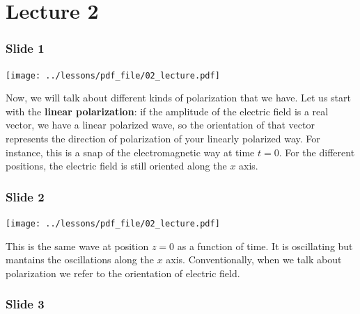 \documentclass[../main/main.tex]{subfiles}
\begin{document}
\pagestyle{plain}

\section{Lecture 2}


\subsubsection*{Slide 1}

\begin{minipage}[]{0.5\linewidth}
\centering
\texttt{[image: ../lessons/pdf\_file/02\_lecture.pdf]}
\end{minipage}
\hspace{0.3cm}\vspace{0.3cm}
\begin{minipage}[c]{0.47\linewidth}
Now, we will talk about different kinds of polarization that we have. Let us start with the \textbf{linear polarization}: if the amplitude of the electric field is a real vector, we have a linear polarized wave, so the orientation of that vector represents the direction of polarization of your linearly polarized way. For instance, this is a snap of the electromagnetic way at time \( t=0 \). For the different positions, the electric field is still oriented along the \( x \) axis.
\end{minipage}

\subsubsection*{Slide 2}

\begin{minipage}[]{0.5\linewidth}
\centering
\texttt{[image: ../lessons/pdf\_file/02\_lecture.pdf]}
\end{minipage}
\hspace{0.3cm}\vspace{0.3cm}
\begin{minipage}[c]{0.47\linewidth}
This is the same wave at position \( z=0 \) as a function of time. It is oscillating but mantains the oscillations along the \( x \) axis. Conventionally, when we talk about polarization we refer to the orientation of electric field.
\end{minipage}

\subsubsection*{Slide 3}
\end{document}
